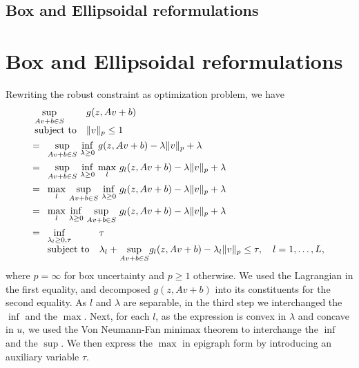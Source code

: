 \ifpreprint
\subsection{Box and Ellipsoidal reformulations}
\else
\section{Box and Ellipsoidal reformulations}
\fi
\label{apx:boxproof}
Rewriting the robust constraint as optimization problem, we have
{\allowdisplaybreaks \begin{align*}
& \begin{array}[t]{ll}
	\underset{Av+b\in S}{\sup} & g(z,Av+b) \\
	\mbox{subject to} & \|v\|_p \le 1
\end{array}\\
&= \begin{array}[t]{ll}
	\underset{Av+b\in S}{\sup}  ~\underset{\lambda \geq 0}{\inf}~g(z,Av+b)  - \lambda\| v\|_p  + \lambda\\
	\end{array}\\
	&= \begin{array}[t]{ll}
	\underset{Av+b\in S}{\sup} ~ \underset{\lambda \geq 0}{\inf}  ~\underset{l}{\max}~g_l(z,Av+b)  - \lambda\|v \|_p  + \lambda\\
		\end{array}\\
		&= \begin{array}[t]{ll}
			\underset{l}{\max}~ \underset{Av+b\in S}{\sup} ~ \underset{\lambda \geq 0}{\inf}  ~g_l(z,Av+b)  - \lambda\| v\|_p  + \lambda\\
				\end{array}\\
			&= \begin{array}[t]{ll}
					\underset{l}{\max}~ \underset{\lambda \geq 0}{\inf} ~ \underset{Av+b\in S}{\sup}~ g_l(z,Av+b)  - \lambda\| v \|_p  + \lambda\\
						\end{array}\\
&= \begin{array}[t]{ll}
	\underset{\lambda_l \geq 0, \tau}{\inf} & \tau\\
	\mbox{subject to} & \lambda_l + \underset{Av+b\in S}{\sup } g_l(z,Av+b) - \lambda_l  \|v \|_p \leq \tau, \quad l = 1,\dots,L,
\end{array}
\end{align*}}
where $p = \infty$ for box uncertainty and $p \geq 1$ otherwise. We used the Lagrangian in the first equality, and decomposed $g(z,Av+b)$ into its constituents for the second equality. As $l$ and $\lambda$ are separable, in the third step we interchanged the $\inf$ and the $\max$. Next, for each $l$, as the expression is convex in $\lambda$ and concave in $u$, we used the Von Neumann-Fan minimax theorem to interchange the $\inf$ and the $\sup$. We then express the $\max$ in epigraph form by introducing an auxiliary variable $\tau$.

